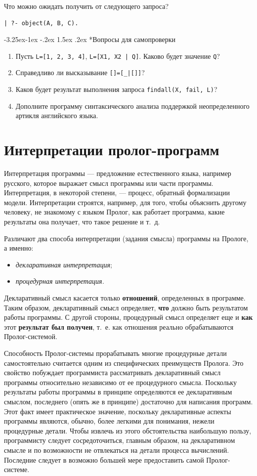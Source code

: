 \documentclass[12pt, openany, twoside]{book} %
\makeatletter
\renewcommand\subsubsection{\@startsection{subsubsection}{3}{\z@}%
                                     {-3.25ex\@plus -1ex \@minus -.2ex}%
                                     {1.5ex \@plus .2ex}%
                                     {\normalfont\normalsize\bfseries}}
\newenvironment{questions}{\subsubsection*{Вопросы для самопроверки}\begin{enumerate}}{\end{enumerate}}
\makeatother
\begin{document}
Что можно ожидать получить от следующего запроса?
{\tt\begin{verbatim}
| ?- object(А, В, С).
\end{verbatim}}
\begin{questions}
\item{} Пусть \texttt{L=[1, 2, 3, 4]}, \texttt{L=[X1, X2 | Q]}. Каково будет значение \texttt{Q}?
\item{} Справедливо ли высказывание \texttt{[]=[\_|[]]}?
\item{} Каков будет результат выполнения запроса \texttt{findall(X, fail, L)}?
\item{} Дополните программу синтаксического анализа поддержкой не\-опре\-де\-лен\-но\-го артикля английского языка.
\end{questions}

\chapter{Интерпретации пролог-программ}
Интерпретация программы --- предложение естественного языка, например русского, которое выражает смысл программы или части программы. Интерпретация, в некоторой степени, ---  процесс, обратный формализации модели. Интерпретации строятся, например, для того, чтобы объяснить другому человеку, не знакомому с языком Пролог, как работает программа, какие результаты она получает, что такое решение и т.~д.

Различают два способа \cite{Bratko} интерпретации (задания смысла) программы на Прологе, а именно:
\begin{itemize}
\item \emph{декларативная интерпретация};
\item \emph{процедурная интерпретация.}
\end{itemize}


Декларативный смысл касается только \textbf{отношений}, определенных в программе. Таким образом, декларативный смысл определяет, {\bf что} должно быть результатом работы программы. С другой стороны, процедурный смысл определяет еще и {\bf как} этот {\bf результат был получен}, т.~е. как отношения реально обрабатываются Пролог-системой.

Способность Пролог-системы прорабатывать многие процедурные детали самостоятельно считается одним из специфических преимуществ Пролога. Это свойство побуждает программиста рассматривать декларативный смысл программы относительно независимо от ее процедурного смысла. Поскольку результаты работы программы в принципе определяются ее декларативным смыслом, последнего (опять же в принципе) достаточно для написания программ. Этот факт имеет практическое значение, поскольку декларативные аспекты программы являются, обычно, более легкими для понимания, нежели процедурные детали. Чтобы извлечь из этого обстоятельства наибольшую пользу, программисту следует сосредоточиться, главным образом, на декларативном смысле и по возможности не отвлекаться на детали процесса вычислений. Последние следует в возможно большей мере предоставить самой Пролог-системе.
\end{document}

